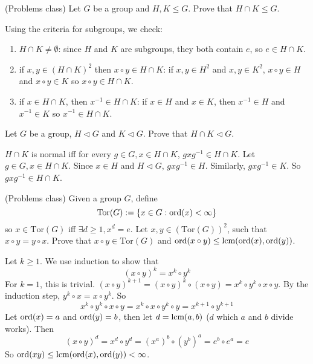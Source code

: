 \begin{example}
	(Problems class) Let $G$ be a group and $H, K \le G$. Prove that $H \cap K \le G$.

	Using the criteria for subgroups, we check:
	\begin{enumerate}
		\item $H \cap K \ne \emptyset$: since $H$ and $K$ are subgroups, they both contain $e$, so $e \in H \cap K$.
		\item if $x, y \in {(H \cap K)}^2$ then $x \circ y \in H \cap K$: if $x, y \in H^2$ and $x, y \in K^2$, $x \circ y \in H$ and $x \circ y \in K$ so $x \circ y \in H \cap K$.
		\item if $x \in H \cap K$, then $x^{-1} \in H \cap K$: if $x \in H$ and $x \in K$, then $x^{-1} \in H$ and $x^{-1} \in K$ so $x^{-1} \in H \cap K$.
	\end{enumerate}
\end{example}

\begin{example}
	Let $G$ be a group, $H \triangleleft G$ and $K \triangleleft G$. Prove that $H \cap K \triangleleft G$.

	$H \cap K$ is normal iff for every $g \in G, x \in H \cap K$, $gx g^{-1} \in H \cap K$. Let $g \in G, x \in H \cap K$. Since $x \in H$ and $H \triangleleft G$, $g x g^{-1} \in H$. Similarly, $g x g^{-1} \in K$. So $g x g^{-1} \in H \cap K$.
\end{example}

\begin{example}
	(Problems class) Given a group $G$, define
	\[
		\text{Tor}(G) := \{ x \in G: \text{ord}(x) < \infty \}
	\]
	so $x \in \text{Tor}(G)$ iff $\exists d \ge 1, x^d = e$. Let $x, y \in {(\text{Tor}(G))}^2$, such that $x \circ y = y \circ x$. Prove that $x \circ y \in \text{Tor}(G)$ and $\text{ord}(x \circ y) \le \text{lcm}(\text{ord}(x), \text{ord}(y))$.

	Let $k \ge 1$. We use induction to show that
	\[
		{(x \circ y)}^k = x^k \circ y^k
	\]
	For $k = 1$, this is trivial. ${(x \circ y)}^{k + 1} = {(x \circ y)}^k \circ (x \circ y) = x^k \circ y^k \circ x \circ y$. By the induction step, $y^k \circ x = x \circ y^k$. So
	\[
		x^k \circ y^k \circ x \circ y = x^k \circ x \circ y^k \circ y = x^{k + 1} \circ y^{k + 1}
	\]
	Let $\text{ord}(x) = a$ and $\text{ord}(y) = b$, then let $d = \text{lcm}(a, b)$ ($d$ which $a$ and $b$ divide works). Then
	\[
		{(x \circ y)}^d = x^d \circ y^d = {(x^a)}^b \circ {(y^b)}^a = e^b \circ e^a = e
	\]
	So $\text{ord}(xy) \le \text{lcm}(\text{ord}(x), \text{ord}(y)) < \infty$.
\end{example}

